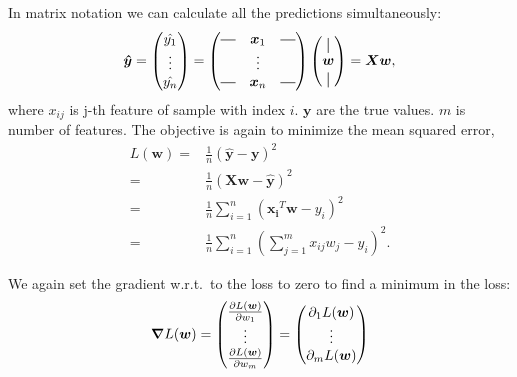 In matrix notation we can calculate all the predictions simultaneously:
\begin{align}
    \bm{\hat{y}} = 
    \begin{pmatrix}
        \hat{y_{1}} \\
        \vdots\\
        \hat{y_{n}} 
    \end{pmatrix}  =
    \begin{pmatrix}
        \horzbar & \bm{x}_1 & \horzbar \\
                  & \vdots   &  \\
        \horzbar & \bm{x}_n &  \horzbar \\
    \end{pmatrix} 
    \begin{pmatrix}
        \vertbar \\
        \bm{w}\\
        \vertbar
    \end{pmatrix}=\bm{Xw},
\end{align}
where $x_{ij}$ is j-th feature of sample with index $i$. $\bm{y}$ are the true values.
$m$ is number of features.
The objective is again to minimize the mean squared error,
\begin{align}
    L(\bm{w}) =& \frac{1}{n}(\hat{\bm{y}}-\bm{y})^2 \\
              =& \frac{1}{n}(\bm{X}\bm{w}-\hat{\bm{y}})^2 \\
              =& \frac{1}{n}\sum_{i=1}^{n}(\bm{x_{i}}^T\bm{w}-y_{i})^2 \\ 
              =& \frac{1}{n}\sum_{i=1}^{n}\left(\sum_{j=1}^{m}x_{ij}w_{j}-y_{i}\right)^2.
\end{align}

We again set the gradient w.r.t.\ to the loss to zero to find a minimum in the loss:
\begin{equation*}
  \begin{array}{l}
   \bm{\nabla}L(\bm{w})=
    \begin{pmatrix}
        \pdv{L(\bm{w})}{w_{1}}\\
        \vdots\\
        \pdv{L(\bm{w})}{w_{m}}
    \end{pmatrix}
    =
    \begin{pmatrix}
        \partial_1 L(\bm{w})\\
        \vdots\\
        \partial_m L(\bm{w})
    \end{pmatrix}
  \end{array}
\end{equation*}

